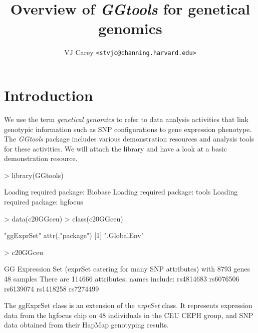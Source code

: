 \documentclass[12pt]{article}
\newcommand{\Rpackage}[1]{{\textit{#1}}}
\newcommand{\Rclass}[1]{{\textit{#1}}}
\begin{document}

\title{Overview of \Rpackage{GGtools} for genetical genomics}
\author{VJ Carey \texttt{<stvjc@channing.harvard.edu>}}
\maketitle

\section{Introduction}

We use the term \textit{genetical genomics} to refer to
data analysis activities that link genotypic information
such as SNP configurations to gene expression phenotype.
The \Rpackage{GGtools} package includes various
demonstration resources and analysis tools for these
activities.
We will attach the library and have a look at a basic
demonstration resource.
\begin{Schunk}
\begin{Sinput}
> library(GGtools)
\end{Sinput}
\begin{Soutput}
Loading required package: Biobase
Loading required package: tools
Loading required package: hgfocus
\end{Soutput}
\begin{Sinput}
> data(c20GGceu)
> class(c20GGceu)
\end{Sinput}
\begin{Soutput}
[1] "ggExprSet"
attr(,"package")
[1] ".GlobalEnv"
\end{Soutput}
\begin{Sinput}
> c20GGceu
\end{Sinput}
\begin{Soutput}
GG Expression Set (exprSet catering for many SNP attributes) with 
	8793 genes
	48 samples
There are  114666  attributes; names include:
rs4814683 rs6076506 rs6139074 rs1418258 rs7274499 
\end{Soutput}
\end{Schunk}
The ggExprSet class is an extension of the
\Rclass{exprSet} class.  It represents expression
data from the hgfocus chip on 48 individuals in the CEU
CEPH group, and SNP data obtained from their HapMap genotyping
results.
\end{document}
